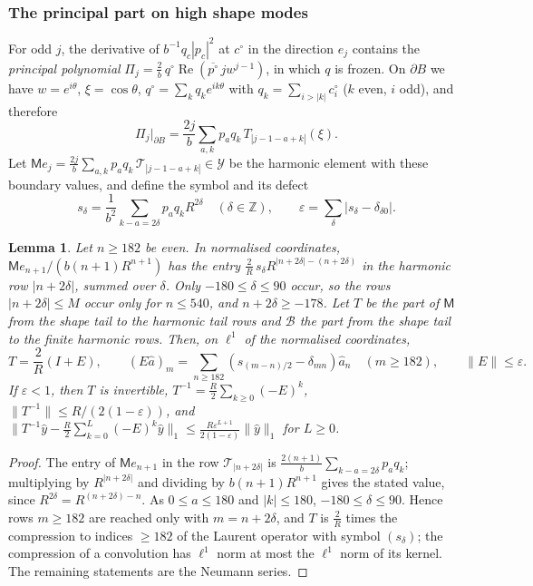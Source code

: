 \documentclass[11pt]{amsart}
\newtheorem{lemma}[theorem]{Lemma}
\theoremstyle{definition}
\theoremstyle{remark}
\numberwithin{equation}{section}
\newcommand{\Z}{\mathbb{Z}}
\newcommand{\eps}{\varepsilon}
\DeclareMathOperator{\re}{Re}
\newcommand{\nrm}[1]{\lVert #1\rVert}
\begin{document}
\subsubsection*{The principal part on high shape modes}
For odd $j$, the derivative of $b^{-1}q_c|p_c|^2$ at $c^\circ$ in the direction $e_j$ contains the \emph{principal polynomial} $\Pi_j=\frac2b\,q^\circ\re(\overline{p^\circ}\,jw^{j-1})$, in which $q$ is frozen. On $\partial B$ we have $w=e^{i\theta}$, $\xi=\cos\theta$, $q^\circ=\sum_kq_ke^{ik\theta}$ with $q_k=\sum_{i>|k|}c^\circ_i$ ($k$ even, $i$ odd), and therefore
\[
\Pi_j|_{\partial B}=\frac{2j}b\sum_{a,k}p_aq_k\,T_{|j-1-a+k|}(\xi) .
\]
Let $\mathsf Me_j=\frac{2j}b\sum_{a,k}p_aq_k\,\mathcal T_{|j-1-a+k|}\in\mathcal Y$ be the harmonic element with these boundary values, and define the symbol and its defect
\[
s_\delta=\frac1{b^2}\sum_{k-a=2\delta}p_aq_kR^{2\delta}\quad(\delta\in\Z),\qquad \eps=\sum_\delta|s_\delta-\delta_{\delta0}| .
\]

\begin{lemma}\label{r3:lem-principal}
Let $n\geq182$ be even. In normalised coordinates, $\mathsf Me_{n+1}/(b(n+1)R^{n+1})$ has the entry $\frac2R\,s_\delta R^{|n+2\delta|-(n+2\delta)}$ in the harmonic row $|n+2\delta|$, summed over $\delta$. Only $-180\leq\delta\leq90$ occur, so the rows $|n+2\delta|\leq M$ occur only for $n\leq540$, and $n+2\delta\geq-178$. Let $T$ be the part of $\mathsf M$ from the shape tail to the harmonic tail rows and $\mathcal B$ the part from the shape tail to the finite harmonic rows. Then, on $\ell^1$ of the normalised coordinates,
\[
T=\frac2R(I+E),\qquad (E\hat a)_m=\sum_{n\geq182}(s_{(m-n)/2}-\delta_{mn})\hat a_n\quad(m\geq182),\qquad\nrm E\leq\eps .
\]
If $\eps<1$, then $T$ is invertible, $T^{-1}=\frac R2\sum_{k\geq0}(-E)^k$, $\nrm{T^{-1}}\leq R/(2(1-\eps))$, and $\big\|T^{-1}\hat y-\frac R2\sum_{k=0}^L(-E)^k\hat y\big\|_1\leq\frac{R\eps^{L+1}}{2(1-\eps)}\nrm{\hat y}_1$ for $L\geq0$.
\end{lemma}

\begin{proof}
The entry of $\mathsf Me_{n+1}$ in the row $\mathcal T_{|n+2\delta|}$ is $\frac{2(n+1)}b\sum_{k-a=2\delta}p_aq_k$; multiplying by $R^{|n+2\delta|}$ and dividing by $b(n+1)R^{n+1}$ gives the stated value, since $R^{2\delta}=R^{(n+2\delta)-n}$. As $0\leq a\leq180$ and $|k|\leq180$, $-180\leq\delta\leq90$. Hence rows $m\geq182$ are reached only with $m=n+2\delta$, and $T$ is $\frac2R$ times the compression to indices $\geq182$ of the Laurent operator with symbol $(s_\delta)$; the compression of a convolution has $\ell^1$ norm at most the $\ell^1$ norm of its kernel. The remaining statements are the Neumann series.
\end{proof}
\end{document}
